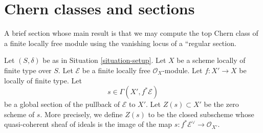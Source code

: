 \section{Chern classes and sections}
\label{section-top-chern-class}

\noindent
A brief section whose main result is that we may compute the
top Chern class of a finite locally free module using the
vanishing locus of a ``regular section.

\medskip\noindent
Let $(S, \delta)$ be as in Situation \ref{situation-setup}. Let $X$ be a scheme
locally of finite type over $S$. Let $\mathcal{E}$ be a finite locally
free $\mathcal{O}_X$-module. Let $f : X' \to X$ be locally of finite type. Let
$$
s \in \Gamma(X', f^*\mathcal{E})
$$
be a global section of the pullback of $\mathcal{E}$ to $X'$. Let
$Z(s) \subset X'$ be the zero scheme of $s$. More precisely, we define
$Z(s)$ to be the closed subscheme whose quasi-coherent sheaf
of ideals is the image of the map
$s : f^*\mathcal{E}^\vee \to \mathcal{O}_{X'}$.

